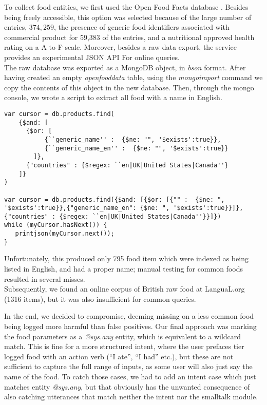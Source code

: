 To collect food entities, we first used the Open Food Facts database \cite{openfoodfacts}. Besides being freely accessible, this option was selected because of the large number of entries, $374,259$, the presence of generic food identifiers associated with commercial product for 59,383 of the entries, and a nutritional approved health rating on a A to F scale. Moreover, besides a raw data export, the service provides an experimental JSON API For online queries. \\
The raw database was exported as a MongoDB \cite{mongo} object, in \textit{bson} format. After having created an empty \textit{openfooddata} table, using the \textit{mongoimport} command we copy the contents of this object in the new database. Then, through the mongo console, we wrote a script to extract all food with a name in English.
\begin{lstlisting}
var cursor = db.products.find( 
    {$and: [
      {$or: [
           {``generic_name'' :  {$ne: "", '$exists':true}},
           {``generic_name_en'' :  {$ne: "", '$exists':true}}
        ]},
      {"countries" : {$regex: ``en|UK|United States|Canada''}
    ]}
)

var cursor = db.products.find({$and: [{$or: [{"" :  {$ne: ", '$exists':true}},{"generic_name_en": {$ne: ", '$exists':true}}]}, {"countries" : {$regex: ``en|UK|United States|Canada''}}]})
while (myCursor.hasNext()) {
   printjson(myCursor.next());
}
\end{lstlisting}

Unfortunately, this produced only 795 food item which were indexed as being listed in English, and had a proper name; manual testing for common foods resulted in several misses.\\
Subsequently, we found an online corpus of British raw food at LanguaL.org \cite{langual}(1316 items), but it was also insufficient for common queries. 

In the end, we decided to compromise, deeming missing on a less common food being logged more harmful than false positives. Our final approach was marking the food parameters as a \textit{@sys.any} entity, which is equivalent to a wildcard match. This is fine for a more structured intent, where the user prefaces tier logged food with an action verb (``I ate'', ``I had'' etc.), but these are not sufficient to capture the full range of inputs, as some user will also just say the name of the food. To catch those cases, we had to add an intent case which just matches entity \textit{@sys.any}, but that obviously has the unwanted consequence of also catching utterances that match neither the intent nor the smalltalk module.
